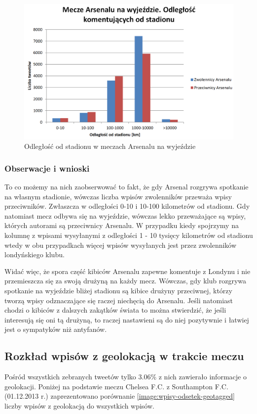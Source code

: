 \begin{figure}[ht!]
\centering
\includegraphics[width=140mm]{img//odleglosc-od-stadionu-away.png}
\caption{Odległość od stadionu w meczach Arsenalu na wyjeździe}
\label{image:odleglosc-od-stadionu-gosc}
\end{figure}

\subsubsection{Obserwacje i wnioski}
To co możemy na nich zaobserwować to fakt, że gdy Arsenal rozgrywa spotkanie na własnym
stadionie, wówczas liczba wpisów zwolenników przeważa wpisy przeciwników.
Zwłaszcza w odległości 0-10 i 10-100 kilometrów od stadionu.
Gdy natomiast mecz odbywa się na wyjeździe, wówczas lekko przeważające
są wpisy, których autorami są przeciwnicy Arsenalu.
W przypadku kiedy spojrzymy na kolumnę z wpisami wysyłanymi z odległości
1 - 10 tysięcy kilometrów od stadionu wtedy w obu przypadkach
więcej wpisów wysyłanych jest przez zwolenników londyńskiego klubu.

Widać więc, że spora część kibiców Arsenalu zapewne komentuje z Londynu
i nie przemieszcza się za swoją drużyną na każdy mecz. Wówczas, gdy klub rozgrywa
spotkanie na wyjeździe bliżej stadionu są kibice drużyny przeciwnej,
którzy tworzą wpisy odznaczające się raczej niechęcią do Arsenalu. 
Jeśli natomiast
chodzi o kibiców z dalszych zakątków świata to można stwierdzić, że
jeśli interesują się oni tą drużyną, to raczej nastawieni są do niej pozytywnie
i łatwiej jest o sympatyków niż antyfanów.


\clearpage
\subsection{Rozkład wpisów z geolokacją w trakcie meczu}
\label{subsection:geowpisy}
Pośród wszystkich zebranych tweetów tylko 3.06\% z nich zawierało informacje o
geolokacji. Poniżej na podstawie meczu Chelsea F.C. z Southampton F.C.
(01.12.2013 r.) zaprezentowano porównanie \ref{image:wpisy-odsetek-geotagged}
liczby wpisów z geolokacją do wszystkich wpisów.

